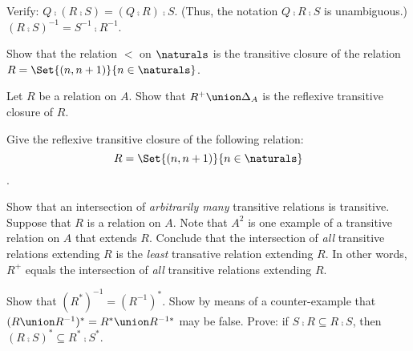 \documentclass{report}
\begin{document}
\begin{Exercise} [number=41]
  Verify:
  \Question $Q \comp (R \comp S) = (Q \comp R) \comp S$. (Thus, the
  notation $Q \comp R \comp S$ is unambiguous.)
  \Question $(R \comp S)^{-1} = S^{-1} \comp R^{-1}$.
\end{Exercise}


\begin{Exercise} [number=45]
  Show that the relation $<$ on $\naturals$ is the transitive closure
  of the relation $R = \Set{(n,n+1)}{n \in \naturals}$.
\end{Exercise}

\begin{Exercise} [number=46]
  Let $R$ be a relation on $A$. Show that $R^+ \union \Delta_A$ is the
  reflexive transitive closure of $R$.
\end{Exercise}

\begin{Exercise} [number=47]
  Give the reflexive transitive closure of the following relation: \[R
  = \Set{(n,n+1)}{n \in \naturals}\].
\end{Exercise}

\begin{Exercise} [number=48,difficulty=1]
  \Question Show that an intersection of \emph{arbitrarily many} transitive
  relations is transitive.
  \Question Suppose that $R$ is a relation on $A$. Note that $A^2$ is
  one example of a transitive relation on $A$ that extends
  $R$. Conclude that the intersection of \emph{all} transitive relations
  extending $R$ is the \emph{least} transative relation extending $R$. In
  other words, $R^+$ equals the intersection of \emph{all} transitive
  relations extending $R$.
\end{Exercise}

\begin{Exercise} [difficulty=1,number=49]
  \Question Show that $(R^*)^{-1} = (R^{-1})^*$.
  \Question Show by means of a counter-example that $(R \union
  R^{-1})^* = R^* \union R^{-1*}$ may be false.
  \Question Prove: if $S \comp R \subseteq R \comp S$, then $(R \comp
  S)^* \subseteq R^* \comp S^*$.
\end{Exercise}
\end{document}
